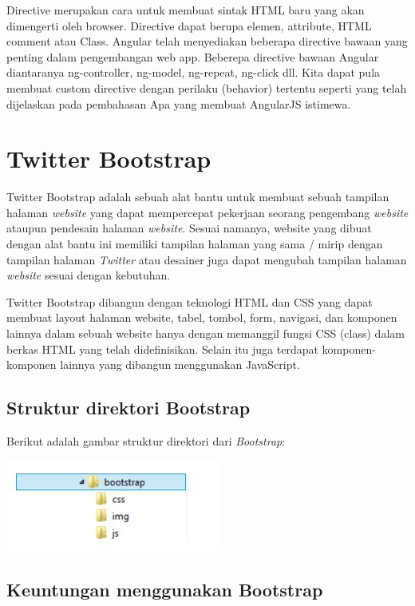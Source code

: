 	Directive merupakan cara untuk membuat sintak HTML baru yang akan dimengerti oleh browser. Directive dapat berupa elemen, attribute, HTML comment atau Class. Angular telah menyediakan beberapa directive bawaan yang penting dalam pengembangan web app. Beberepa directive bawaan Angular diantaranya ng-controller, ng-model, ng-repeat, ng-click dll. Kita dapat pula membuat custom directive dengan perilaku (behavior) tertentu seperti yang telah dijelaskan pada pembahasan Apa yang membuat AngularJS istimewa.
	
\section{Twitter Bootstrap}
\label{sec: bootstrap}

	Twitter Bootstrap adalah sebuah alat bantu untuk membuat sebuah tampilan halaman \textit{website} yang dapat mempercepat pekerjaan seorang pengembang \textit{website} ataupun pendesain halaman \textit{website}. Sesuai namanya, website yang dibuat dengan alat bantu ini memiliki tampilan halaman yang sama / mirip dengan tampilan halaman \textit{Twitter} atau desainer juga dapat mengubah tampilan halaman \textit{website} sesuai dengan kebutuhan.

	Twitter Bootstrap dibangun dengan teknologi HTML dan CSS yang dapat	membuat layout halaman website, tabel, tombol, form, navigasi, dan komponen	lainnya dalam sebuah website hanya dengan memanggil fungsi CSS (class) dalam berkas HTML yang telah didefinisikan. Selain itu juga terdapat komponen-komponen lainnya yang dibangun menggunakan JavaScript.
	
	\subsection{Struktur direktori Bootstrap}
	\label{sub: struturDirektoriBootstrap}
	
	Berikut adalah gambar struktur direktori dari \textit{Bootstrap}:
	
	\includegraphics[scale= 1.0]{Gambar/strukturBootstrap}
	
	\subsection{Keuntungan menggunakan Bootstrap}
	\label{sub: keuntunganBootstrap}
	
